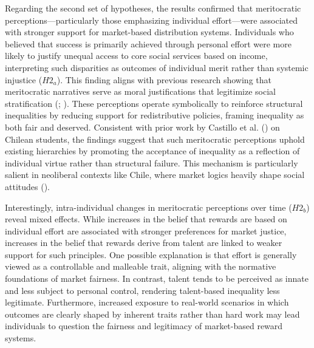 \documentclass[
  12pt,
]{article}
\begin{document}
Regarding the second set of hypotheses, the results confirmed that
meritocratic perceptions---particularly those emphasizing individual
effort---were associated with stronger support for market-based
distribution systems. Individuals who believed that success is primarily
achieved through personal effort were more likely to justify unequal
access to core social services based on income, interpreting such
disparities as outcomes of individual merit rather than systemic
injustice (\(H2_{a}\)). This finding aligns with previous research
showing that meritocratic narratives serve as moral justifications that
legitimize social stratification
(;
). These perceptions
operate symbolically to reinforce structural inequalities by reducing
support for redistributive policies, framing inequality as both fair and
deserved. Consistent with prior work by Castillo et al.
() on Chilean students,
the findings suggest that such meritocratic perceptions uphold existing
hierarchies by promoting the acceptance of inequality as a reflection of
individual virtue rather than structural failure. This mechanism is
particularly salient in neoliberal contexts like Chile, where market
logics heavily shape social attitudes
().

Interestingly, intra-individual changes in meritocratic perceptions over
time (\(H2_{b}\)) reveal mixed effects. While increases in the belief
that rewards are based on individual effort are associated with stronger
preferences for market justice, increases in the belief that rewards
derive from talent are linked to weaker support for such principles. One
possible explanation is that effort is generally viewed as a
controllable and malleable trait, aligning with the normative
foundations of market fairness. In contrast, talent tends to be
perceived as innate and less subject to personal control, rendering
talent-based inequality less legitimate. Furthermore, increased exposure
to real-world scenarios in which outcomes are clearly shaped by inherent
traits rather than hard work may lead individuals to question the
fairness and legitimacy of market-based reward systems.
\end{document}
